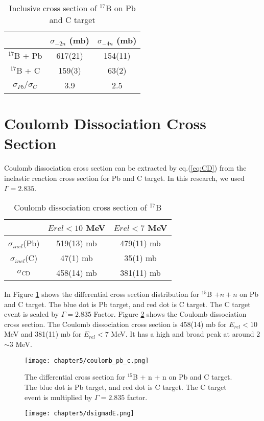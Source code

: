 \begin{table}[h]
\centering
\begin{tabular}{c|c|c}
    \hline
     & $\sigma_{-2n}$ (mb) & $\sigma_{-4n}$ (mb) \\
    \hline
    $^{17}$B + Pb& 617(21) & 154(11) \\ 
    $^{17}$B + C & 159(3) & 63(2) \\ 
    \hline 
    $\sigma_{Pb}/\sigma_{C}$ & 3.9 & 2.5 \\ 
    \hline
\end{tabular}
\caption{Inclusive cross section of $^{17}$B on Pb and C target}
\label{tab:Inclusive Cross Section of Boron Isotopes}
\end{table}

\section{Coulomb Dissociation Cross Section}
Coulomb dissociation cross section can be extracted by eq.(\ref{eq:CD}) from the inelastic reaction cross section for  Pb and C target. In this research, we used $\Gamma = 2.835$\cite{Ogata}. 

\begin{table}[h]
    \centering
    \begin{tabular}[h]{c|c|c}
        \hline
         &  $E{rel} < 10$ MeV&  $E{rel} < 7$ MeV \\
        \hline
        $\sigma_{inel}$(Pb) &  519(13) mb & 479(11) mb  \\
        $\sigma_{inel}$(C) &  47(1) mb & 35(1) mb  \\
        $\sigma_{\text{CD}}$ &  458(14) mb & 381(11) mb \\
        \hline
    \end{tabular}
\caption{Coulomb dissociation cross section of ${}^{17}$B}
\label{tab:CD}
\end{table}
In Figure \ref{fig:Pb+C} shows the differential cross section distribution for ${}^{15}$B $+ n + n$ on Pb and C target. The blue dot is Pb target, and red dot is C target. The C target event is scaled by $\Gamma = 2.835$ Factor. Figure \ref{fig:CD} shows the Coulomb dissociation cross section. The Coulomb dissociation cross section is 458(14) mb for $E_{rel} < 10$ MeV and 381(11) mb for $E_{rel} < 7$ MeV. It has a high and broad peak at around 2$\sim$3 MeV. 
\begin{figure}[h]
    \centering
    \texttt{[image: chapter5/coulomb\_pb\_c.png]}    
    \caption[The differential cross section for ${}^{15}$B + n + n on Pb and C target]{The differential cross section for ${}^{15}$B + n + n on Pb and C target. The blue dot is Pb target, and red dot is C target. The C target event is multiplied by $\Gamma = 2.835$ factor.}
    \label{fig:Pb+C}
\end{figure}
\begin{figure}[h]
    \centering
    \texttt{[image: chapter5/dsigmadE.png]}    
    \label{fig:CD}
\end{figure}    
\clearpage

